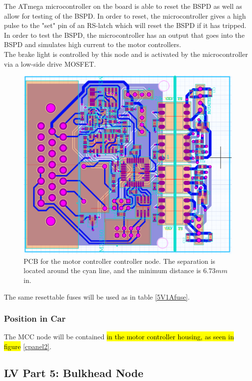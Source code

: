 \documentclass{article}
\DeclareRobustCommand{\hlr}[1]{{\sethlcolor{red}\hl{#1}}}
\begin{document}
        The ATmega microcontroller on the board is able to reset the BSPD as well as allow for testing of the BSPD. In order to reset, the microcontroller gives a high pulse to the "set" pin of an RS-latch which will reset the BSPD if it has tripped. In order to test the BSPD, the microcontroller has an output that goes into the BSPD and simulates high current to the motor controllers.\\

        The brake light is controlled by this node and is activated by the microcontroller via a low-side drive MOSFET.\\

        \begin{figure}[H]
        \centering
        \includegraphics[width = 0.8 \textwidth]{mccPCB}
        \caption{PCB for the motor controller controller node. The separation is located around the cyan line, and the minimum distance is $6.73 mm$ in.}
        \label{mccPCB}
        \end{figure}

        The same resettable fuses will be used as in table \ref{5V1Afuse}.

        \subsubsection{Position in Car}

        The MCC node will be contained \hlr{in the motor controller housing, as seen in figure} \ref{cpanel2}.\\

        \subsection{LV Part 5: Bulkhead Node}
\end{document}

